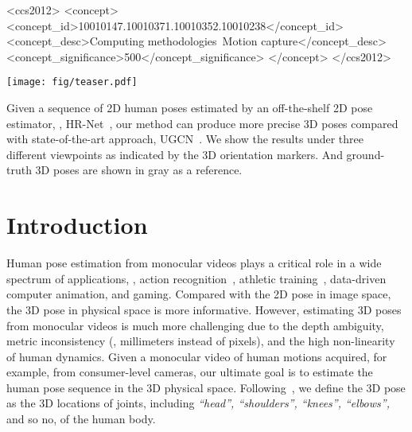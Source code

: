 \documentclass[sigconf]{acmart}
\begin{document}
	\begin{CCSXML}
		<ccs2012>
		<concept>
		<concept_id>10010147.10010371.10010352.10010238</concept_id>
		<concept_desc>Computing methodologies~Motion capture</concept_desc>
		<concept_significance>500</concept_significance>
		</concept>
		</ccs2012>
	\end{CCSXML}
	
	
	
\begin{teaserfigure}
		\centering
		\vspace*{-2mm}
		\texttt{[image: fig/teaser.pdf]}
		\vspace*{-4mm}
		\caption{Given a sequence of 2D human poses estimated by an off-the-shelf 2D pose estimator, \eg, HR-Net~\cite{sun2019deep}, \textcolor{OURS}{our method} can produce more precise 3D poses compared with state-of-the-art approach, \textcolor{UGCN}{UGCN}~\cite{wang2020motion}.
		We show the results under three different viewpoints as indicated by the 3D orientation markers.
		And ground-truth 3D poses are shown in \textcolor{GT}{gray} as a reference.
		}
		\vspace*{1mm}
\label{fig:teaser}
	\end{teaserfigure}
	
	
\maketitle
	
\section{Introduction}
\label{sec:introduction}




Human pose estimation from monocular videos plays a critical role in a wide spectrum of applications, \eg, action recognition~\cite{luvizon20182d,yan2018spatial}, athletic training~\cite{wang2019ai}, data-driven computer animation, and gaming.
Compared with the 2D pose in image space, the 3D pose in physical space is more informative. However, estimating 3D poses from monocular videos is much more challenging due to the depth ambiguity, metric inconsistency (\ie, millimeters instead of pixels), and the high non-linearity of human dynamics. 
Given a monocular video of human motions acquired, for example, from consumer-level cameras, our ultimate goal is to estimate the human pose sequence in the 3D physical space.
Following~\cite{martinez2017simple,pavllo20193d,wang2020motion}, we define the 3D pose as the 3D locations of joints, including \textit{``head'', ``shoulders'', ``knees'', ``elbows'',} and so no, of the human body.
\end{document}

